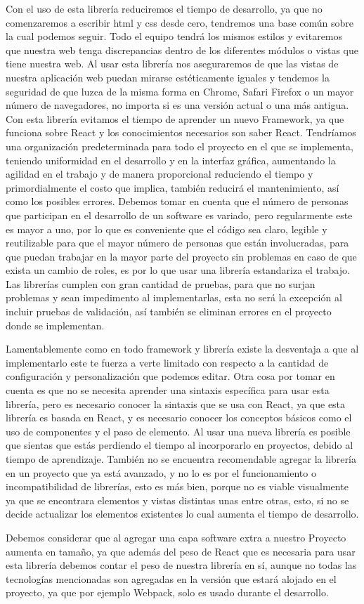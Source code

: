 Con el uso de esta librería reduciremos el tiempo de desarrollo, ya que no comenzaremos a escribir html y css desde cero, tendremos una base común sobre la cual podemos seguir. Todo el equipo tendrá los mismos estilos y evitaremos que nuestra web tenga discrepancias dentro de los diferentes módulos o vistas que tiene nuestra web. 
Al usar esta librería nos aseguraremos de que las vistas de nuestra aplicación web puedan mirarse estéticamente iguales y tendemos la seguridad de que luzca de la misma forma en Chrome, Safari Firefox o un mayor número de navegadores, no importa si es una versión actual o una más antigua. 
Con esta librería evitamos el tiempo de aprender un nuevo Framework, ya que funciona sobre React y los conocimientos necesarios son saber React. 
Tendríamos una organización predeterminada para todo el proyecto en el que se implementa, teniendo uniformidad en el desarrollo y en la interfaz gráfica, aumentando la agilidad en el trabajo y de manera proporcional reduciendo el tiempo y primordialmente el costo que implica, también reducirá el mantenimiento, así como los posibles errores. 
Debemos tomar en cuenta que el número de personas que participan en el desarrollo de un software es variado, pero regularmente este es mayor a uno, por lo que es conveniente que el código sea claro, legible y reutilizable para que el mayor número de personas que están involucradas, para que puedan trabajar en la mayor parte del proyecto sin problemas en caso de que exista un cambio de roles, es por lo que usar una librería estandariza el trabajo. 
Las librerías cumplen con gran cantidad de pruebas, para que no surjan problemas y sean impedimento al implementarlas, esta no será la excepción al incluir pruebas de validación, así también se eliminan errores en el proyecto donde se implementan. 
  
Lamentablemente como en todo framework y librería existe la desventaja a que al implementarlo este te fuerza a verte limitado con respecto a la cantidad de configuración y personalización que podemos editar. Otra cosa por tomar en cuenta es que no se necesita aprender una sintaxis específica para usar esta librería, pero es necesario conocer la sintaxis que se usa con React, ya que esta librería es basada en React, y es necesario conocer los conceptos básicos como el uso de componentes y el paso de elemento. Al usar una nueva librería es posible que sientas que estás perdiendo el tiempo al incorporarlo en proyectos, debido al tiempo de aprendizaje. También no se encuentra recomendable agregar la librería en un proyecto que ya está avanzado, y no lo es por el funcionamiento o incompatibilidad de librerías, esto es más bien, porque no es viable visualmente ya que se encontrara elementos y vistas distintas unas entre otras, esto, si no se decide actualizar los elementos existentes lo cual aumenta el tiempo de desarrollo.


Debemos considerar que al agregar una capa software extra a nuestro Proyecto aumenta en tamaño, ya que además del peso de React que es necesaria para usar esta librería debemos contar el peso de nuestra librería en sí, aunque no todas  las tecnologías  mencionadas son agregadas en la versión que estará alojado en el proyecto, ya que por ejemplo Webpack, solo es usado durante el desarrollo.
\newpage